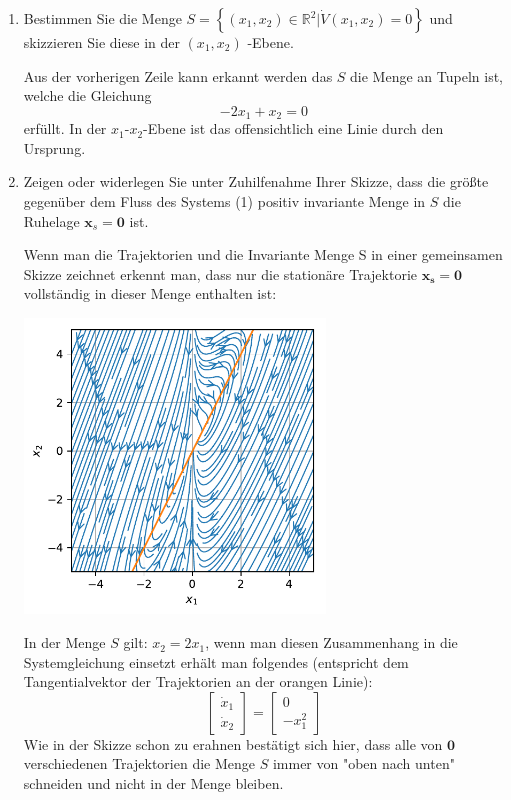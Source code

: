 \documentclass[crop=false]{standalone}
\begin{document}
\begin{taskbreak}
\begin{enumerate}[i]
\begin{solution}
    \end{solution}
    \item Bestimmen Sie die Menge $S=\left\{\left(x_{1}, x_{2}\right) \in \mathbb{R}^{2} | \dot{V}\left(x_{1}, x_{2}\right)=0\right\}$ und skizzieren Sie
diese in der $\left(x_{1}, x_{2}\right)$ -Ebene.
\begin{solution}
Aus der vorherigen Zeile kann erkannt werden das $S$ die Menge an Tupeln ist, welche die Gleichung
\[-2 x_1 + x_2 = 0\]
erfüllt. In der $x_1$-$x_2$-Ebene ist das offensichtlich eine Linie durch den Ursprung.
    \end{solution}
    \item Zeigen oder widerlegen Sie unter Zuhilfenahme Ihrer Skizze, dass die größte gegenüber dem Fluss des Systems (1) positiv invariante Menge in $S$ die Ruhelage $\mathbf{x}_{s}=\mathbf{0}$ ist.
    \begin{solution}
    Wenn man die Trajektorien und die Invariante Menge S in einer gemeinsamen Skizze zeichnet erkennt man, dass nur die stationäre Trajektorie $\mathbf{x_s}=\mathbf{0}$ vollständig in dieser Menge enthalten ist:
    {\centering
        \includegraphics[width = 8cm]{LaSalle2016.pdf}
        \par}
        In der Menge $S$ gilt: $x_2 = 2 x_1$, wenn man diesen Zusammenhang in die Systemgleichung einsetzt erhält man folgendes (entspricht dem Tangentialvektor der Trajektorien an der orangen Linie):
        \[
\left[\begin{array}{c}{\dot{x}_{1}} \\ {\dot{x}_{2}}\end{array}\right]=\left[\begin{array}{c}{0} \\ {-x_1^2}\end{array}\right]
\]
Wie in der Skizze schon zu erahnen bestätigt sich hier, dass alle von $\mathbf{0}$ verschiedenen Trajektorien die Menge $S$ immer von "oben nach unten" schneiden und nicht in der Menge bleiben.
    \end{solution}
    

\end{enumerate}
\end{taskbreak}
\end{document}
